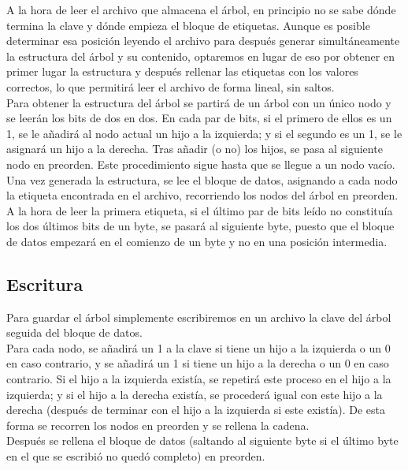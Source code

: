 \documentclass{article}
\begin{document}
A la hora de leer el archivo que almacena el árbol, en principio no se sabe dónde
termina la clave y dónde empieza el bloque de etiquetas. Aunque es posible 
determinar esa posición leyendo el archivo para después generar simultáneamente la 
estructura del árbol y su contenido, optaremos en lugar de eso por obtener en
primer lugar la estructura y después rellenar las etiquetas con los valores
correctos, lo que permitirá leer el archivo de forma lineal, sin saltos. \\

Para obtener la estructura del árbol se partirá de un árbol con un único nodo y se 
leerán los bits de dos en dos. En cada par de bits, si el primero de ellos es un
1, se le añadirá al nodo actual un hijo a la izquierda; y si el segundo es un 1,
se le asignará un hijo a la derecha. Tras añadir (o no) los hijos, se pasa al
siguiente nodo en preorden. Este procedimiento sigue hasta que se llegue a un nodo
vacío. \\

Una vez generada la estructura, se lee el bloque de datos, asignando a cada nodo la
etiqueta encontrada en el archivo, recorriendo los nodos del árbol en preorden. A
la hora de leer la primera etiqueta, si el último par de bits leído no constituía 
los dos últimos bits de un byte, se pasará al siguiente byte, puesto que el bloque 
de datos empezará en el comienzo de un byte y no en una posición intermedia.

\subsection{Escritura}

Para guardar el árbol simplemente escribiremos en un archivo la clave del árbol 
seguida del bloque de datos. \\

Para cada nodo, se añadirá un 1 a la clave si tiene un hijo a la izquierda o un 0
en caso contrario, y se añadirá un 1 si tiene un hijo a la derecha o un 0 en caso 
contrario. Si el hijo a la izquierda existía, se repetirá este proceso en el hijo
a la izquierda; y si el hijo a la derecha existía, se procederá igual con este hijo
a la derecha (después de terminar con el hijo a la izquierda si este existía). De
esta forma se recorren los nodos en preorden y se rellena la cadena. \\

Después se rellena el bloque de datos (saltando al siguiente byte si el último 
byte en el que se escribió no quedó completo) en preorden.
\end{document}
